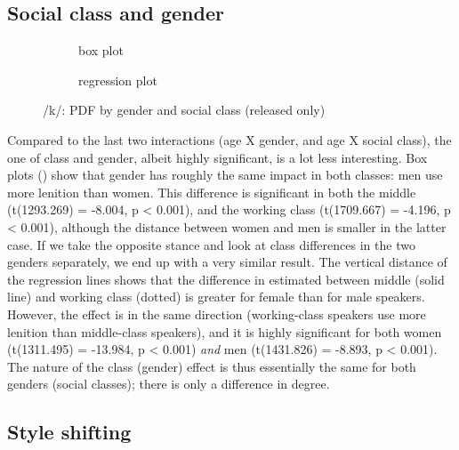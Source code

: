 \subsection{Social class and gender}
\label{sec.prod.res.con.k.classgender}

\begin{figure}
	
	\begin{subfigure}{.49\textwidth}
		
			\resizebox{\linewidth}{!}{} 
		\caption{box plot}
		\label{fig.box.k.classgender}
	\end{subfigure}
	\begin{subfigure}{.49\textwidth}
		
			\resizebox{\linewidth}{!}{} 
		\caption{regression plot}
		\label{fig.scatter.k.classgender}
	\end{subfigure}
	\caption{/k/: PDF by gender and social class (released only)}
\end{figure}

Compared to the last two interactions (age X gender, and age X social class), the one of class and gender, albeit highly significant, is a lot less interesting.
Box plots () show that gender has roughly the same impact in both classes: men use more lenition than women.
This difference is significant in both the middle (t(1293.269) = -8.004, p < 0.001), and the working class (t(1709.667) = -4.196, p < 0.001), although the distance between women and men is smaller in the latter case.
If we take the opposite stance and look at class differences in the two genders separately, we end up with a very similar result.
The vertical distance of the regression lines shows that the difference in estimated  between middle (solid line) and working class (dotted) is greater for female than for male speakers.
However, the effect is in the same direction (working-class speakers use more lenition than middle-class speakers), and it is highly significant for both women (t(1311.495) = -13.984, p < 0.001) \emph{and} men (t(1431.826) = -8.893, p < 0.001).
The nature of the class (gender) effect is thus essentially the same for both genders (social classes); there is only a difference in degree.

\subsection{Style shifting}
\label{sec.prod.res.con.k.shifting}

